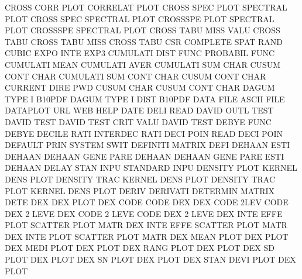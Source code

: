 CROSS    CORR PLOT                      CORRELAT PLOT
CROSS    SPEC PLOT                      SPECTRAL PLOT
CROSS    SPEC                           SPECTRAL PLOT
CROSSSPE PLOT                           SPECTRAL PLOT
CROSSSPE                                SPECTRAL PLOT
CROSS    TABU MISS VALU                 CROSS    TABU
CROSS    TABU MISS                      CROSS    TABU
CSR                                     COMPLETE SPAT RAND
CUBIC    EXPO INTE                      EXP3
CUMULATI DIST FUNC                      PROBABIL FUNC
CUMULATI MEAN                           CUMULATI AVER
CUMULATI SUM  CHAR                      CUSUM    CONT CHAR
CUMULATI SUM  CONT CHAR                 CUSUM    CONT CHAR
CURRENT  DIRE                           PWD
CUSUM    CHAR                           CUSUM    CONT CHAR
DAGUM    TYPE I                         B10PDF
DAGUM    TYPE I    DIST                 B10PDF
DATA     FILE                           ASCII    FILE
DATAPLOT URL                            WEB      HELP
DATE     DELI                           READ
DAVID    OUTL TEST                      DAVID    TEST
DAVID    TEST CRIT VALU                 DAVID    TEST
DEBYE    FUNC                           DEBYE
DECILE   RATI                           INTERDEC RATI
DECI     POIN                           READ     DECI POIN 
DEFAULT  PRIN                           SYSTEM   SWIT
DEFINITI                                MATRIX   DEFI
DEHAAN   ESTI                           DEHAAN
DEHAAN   GENE PARE                      DEHAAN
DEHAAN   GENE PARE ESTI                 DEHAAN
DELAY    STAN INPU                      STANDARD INPU
DENSITY  PLOT                           KERNEL   DENS PLOT
DENSITY  TRAC                           KERNEL   DENS PLOT
DENSITY  TRAC PLOT                      KERNEL   DENS PLOT
DERIV                                   DERIVATI
DETERMIN                                MATRIX   DETE
DEX                                     DEX      PLOT
DEX      CODE                           CODE     DEX
DEX      CODE 2LEV                      CODE     DEX  2    LEVE
DEX      CODE 2    LEVE                 CODE     DEX  2    LEVE
DEX      INTE EFFE PLOT                 SCATTER  PLOT MATR
DEX      INTE EFFE                      SCATTER  PLOT MATR
DEX      INTE PLOT                      SCATTER  PLOT MATR
DEX      MEAN PLOT                      DEX      PLOT
DEX      MEDI PLOT                      DEX      PLOT
DEX      RANG PLOT                      DEX      PLOT
DEX      SD   PLOT                      DEX      PLOT
DEX      SN   PLOT                      DEX      PLOT
DEX      STAN DEVI PLOT                 DEX      PLOT
